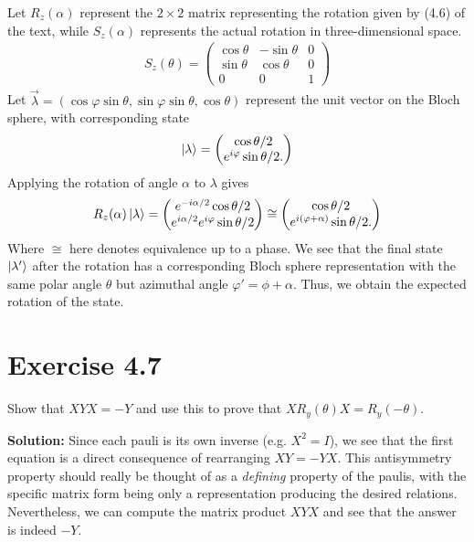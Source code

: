 \documentclass{book}
\begin{document}
    Let $R_{z}(\alpha)$ represent the $2\times 2$ matrix representing the rotation given by (4.6) of the text, while $S_z(\alpha)$ represents the actual rotation in three-dimensional space.
    \begin{align}
        S_z (\theta) = \begin{pmatrix}
            \cos\theta & -\sin\theta & 0\\
            \sin\theta & \cos\theta & 0 \\
            0 & 0 & 1
        \end{pmatrix}
    \end{align}
    Let $\vec{\lambda} = (\cos\varphi \sin\theta, \sin\varphi \sin\theta, \cos\theta)$ represent the unit vector on the Bloch sphere, with corresponding state 
    \begin{align}
        \ket{\lambda} = \begin{pmatrix}
            \cos\theta/2 \\
            e^{i\varphi}\sin\theta/2.
        \end{pmatrix}
    \end{align}
    Applying the rotation of angle $\alpha$ to $\lambda$ gives
    \begin{align}
        R_z(\alpha)\ket{\lambda} = \begin{pmatrix}
            e^{-i\alpha/2}\cos\theta/2 \\
            e^{i\alpha/2}e^{i\varphi} \sin\theta/2
        \end{pmatrix} \cong \begin{pmatrix}
            \cos\theta/2 \\
            e^{i(\varphi + \alpha)} \sin\theta/2.
        \end{pmatrix}
    \end{align}
    Where $\cong$ here denotes equivalence up to a phase. We see that the final state $\ket{\lambda'}$ after the rotation has a corresponding Bloch sphere representation with the same polar angle $\theta$ but azimuthal angle $\varphi' = \phi + \alpha$. Thus, we obtain the expected rotation of the state. 

\section*{Exercise 4.7}
    Show that $XYX = -Y$ and use this to prove that $XR_y(\theta)X = R_y(-\theta)$.
    
    \textbf{Solution:} Since each pauli is its own inverse (e.g. $X^2 = I$), we see that the first equation is a direct consequence of rearranging $XY = - YX$. This antisymmetry property should really be thought of as a \emph{defining} property of the paulis, with the specific matrix form being only a representation producing the desired relations. Nevertheless, we can compute the matrix product $XYX$ and see that the answer is indeed $-Y$.
    
\end{document}
